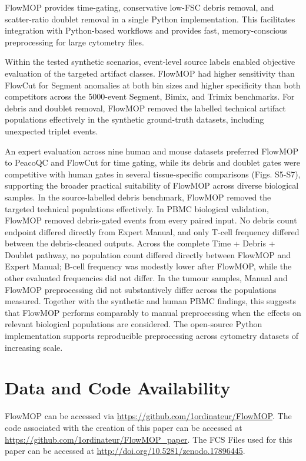\documentclass[ASNA]{latex/wiley/USG}
\begin{document}
FlowMOP provides time-gating, conservative low-FSC debris removal, and
scatter-ratio doublet removal in a single Python implementation. This
facilitates integration with Python-based workflows and provides fast,
memory-conscious preprocessing for large cytometry files.

Within the tested synthetic scenarios, event-level source labels enabled
objective evaluation of the targeted artifact classes. FlowMOP had
higher sensitivity than FlowCut for Segment anomalies at both bin sizes
and higher specificity than both competitors across the 5000-event
Segment, Bimix, and Trimix benchmarks. For debris and doublet removal,
FlowMOP removed the labelled technical artifact populations effectively
in the synthetic ground-truth datasets, including unexpected triplet
events.

An expert evaluation across nine human and mouse datasets preferred
FlowMOP to PeacoQC and FlowCut for time gating, while its debris and
doublet gates were competitive with human gates in several
tissue-specific comparisons (Figs. S5-S7), supporting the broader
practical suitability of FlowMOP across diverse biological samples. In
the source-labelled debris benchmark, FlowMOP removed the targeted
technical populations effectively. In PBMC biological validation,
FlowMOP removed debris-gated events from every paired input. No debris
count endpoint differed directly from Expert Manual, and only T-cell
frequency differed between the debris-cleaned outputs. Across the
complete Time + Debris + Doublet pathway, no population count differed
directly between FlowMOP and Expert Manual; B-cell frequency was
modestly lower after FlowMOP, while the other evaluated frequencies did
not differ. In the tumour samples, Manual and FlowMOP preprocessing did
not substantively differ across the populations measured. Together with
the synthetic and human PBMC findings, this suggests that FlowMOP
performs comparably to manual preprocessing when the effects on relevant
biological populations are considered. The open-source Python
implementation supports reproducible preprocessing across cytometry
datasets of increasing scale.

\FloatBarrier

\section{Data and Code Availability}\label{data-and-code-availability}

FlowMOP can be accessed via
\url{https://github.com/1ordinateur/FlowMOP}. The code associated with
the creation of this paper can be accessed at
\url{https://github.com/1ordinateur/FlowMOP_paper}. The FCS Files used
for this paper can be accessed at
\url{http://doi.org/10.5281/zenodo.17896445}.
\end{document}
